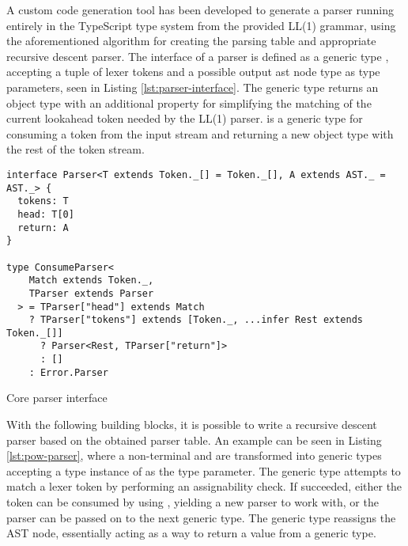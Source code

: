 A custom code generation tool has been developed to generate a parser running entirely in the TypeScript type system from the provided LL(1) grammar, using the aforementioned algorithm for creating the parsing table and appropriate recursive descent parser. The interface of a parser is defined as a generic type , accepting a tuple of lexer tokens and a possible output \acrshort{ast} node type as type parameters, seen in Listing \ref{lst:parser-interface}. The generic type returns an object type with an additional  property for simplifying the matching of the current lookahead token needed by the LL(1) parser.  is a generic type for consuming a token from the input stream and returning a new object type with the rest of the token stream.

\begin{listing}[ht]
  \begin{verbatim}
interface Parser<T extends Token._[] = Token._[], A extends AST._ = AST._> {
  tokens: T
  head: T[0]
  return: A
}

type ConsumeParser<
    Match extends Token._,
    TParser extends Parser
  > = TParser["head"] extends Match
    ? TParser["tokens"] extends [Token._, ...infer Rest extends Token._[]]
      ? Parser<Rest, TParser["return"]>
      : []
    : Error.Parser
\end{verbatim}
  \caption{Core parser interface}\label{lst:parser-interface}
\end{listing}

With the following building blocks, it is possible to write a recursive descent parser based on the obtained parser table. An example can be seen in Listing \ref{lst:pow-parser}, where a non-terminal  and  are transformed into generic types accepting a type instance of  as the type parameter. The generic type attempts to match a lexer token by performing an assignability check. If succeeded, either the token can be consumed by using , yielding a new parser to work with, or the parser can be passed on to the next generic type. The  generic type reassigns the AST node, essentially acting as a way to return a value from a generic type.

